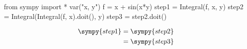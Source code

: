 \documentclass{article}
\begin{document}
\begin{sympycode}
from sympy import *
var("x, y")
f = x + sin(x*y)
step1 = Integral(f, x, y)
step2 = Integral(Integral(f, x).doit(), y)
step3 = step2.doit()
\end{sympycode}
\begin{align*}
\sympy{step1} &= \sympy{step2} \\
&= \sympy{step3}
\end{align*}
\end{document}
